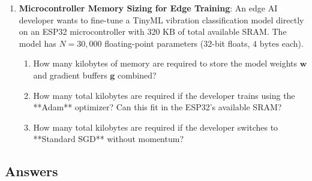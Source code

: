 \begin{checkyourself}
\begin{enumerate}
    \item \textbf{Microcontroller Memory Sizing for Edge Training}:
    An edge AI developer wants to fine-tune a TinyML vibration classification model directly on an ESP32 microcontroller with $320\text{ KB}$ of total available SRAM.
    The model has $N = 30{,}000$ floating-point parameters ($32$-bit floats, $4\text{ bytes}$ each).
    \begin{enumerate}[label=(\alph*)]
        \item How many kilobytes of memory are required to store the model weights $\mathbf{w}$ and gradient buffers $\mathbf{g}$ combined?
        \item How many total kilobytes are required if the developer trains using the **Adam** optimizer? Can this fit in the ESP32's available SRAM?
        \item How many total kilobytes are required if the developer switches to **Standard SGD** without momentum?
    \end{enumerate}
\end{enumerate}
\end{checkyourself}

\subsection*{Answers}

